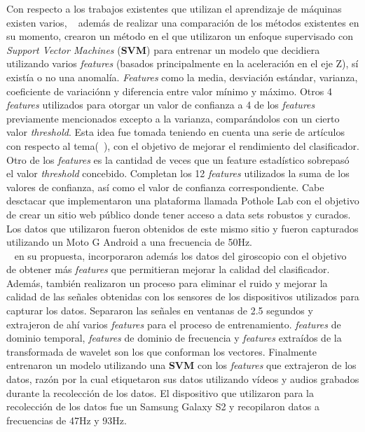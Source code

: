 Con respecto a los trabajos existentes que utilizan el aprendizaje de máquinas existen varios, ~\textcite{carlos2018evaluation} además de realizar
una comparación de los métodos existentes en su momento, crearon un método en el que utilizaron un enfoque supervisado con \emph{Support Vector Machines} 
(\textbf{SVM}) para entrenar un modelo que decidiera utilizando varios \emph{features} (basados principalmente en la aceleración en el eje Z), sí existía
o no una anomalía. \emph{Features} como la media, desviación estándar, varianza, coeficiente de variaciónn y diferencia entre valor mínimo y máximo. Otros
4 \emph{features} utilizados para otorgar un valor de confianza a 4 de los \emph{features} previamente mencionados excepto a la varianza, comparándolos con
un cierto valor \emph{threshold}. Esta idea fue tomada teniendo en cuenta una serie de artículos con respecto al tema(~\textcite{mednis2011real}), con el
objetivo de mejorar el rendimiento del clasificador. Otro de los \emph{features} es la cantidad de veces que un feature estadístico sobrepasó el valor
\emph{threshold} concebido. Completan los 12 \emph{features} utilizados la suma de los valores de confianza, así como el valor de confianza correspondiente.
Cabe desctacar que implementaron una plataforma llamada Pothole Lab con el objetivo de crear un sitio web público donde tener acceso a data sets robustos y
curados. Los datos que utilizaron fueron obtenidos de este mismo sitio y fueron capturados utilizando un Moto G Android a una frecuencia de 50Hz.\\

~\textcite{seraj2015roads} en su propuesta, incorporaron además los datos del giroscopio con el objetivo de obtener más \emph{features} que permitieran mejorar
la calidad del clasificador. Además, también realizaron un proceso para eliminar el ruido y mejorar la calidad de las señales obtenidas con los sensores de los
dispositivos utilizados para capturar los datos. Separaron las señales en ventanas de 2.5 segundos y extrajeron de ahí varios \emph{features} para el proceso
de entrenamiento. \emph{features} de dominio temporal, \emph{features} de dominio de frecuencia y \emph{features} extraídos de la transformada de wavelet son
los que conforman los vectores. Finalmente entrenaron un modelo utilizando una \textbf{SVM} con los \emph{features} que extrajeron de los datos, razón por la
cual etiquetaron sus datos utilizando vídeos y audios grabados durante la recolección de los datos. El dispositivo que utilizaron para la recolección de los
datos fue un Samsung Galaxy S2 y recopilaron datos a frecuencias de 47Hz y 93Hz.\\

